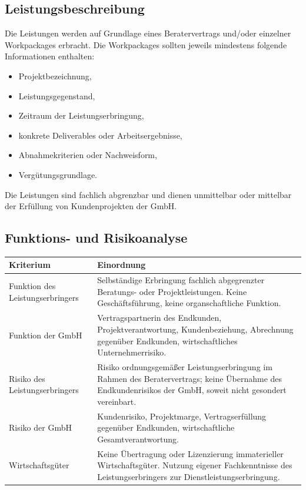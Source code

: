 \documentclass[11pt,a4paper]{article}
\begin{document}
\subsection{Leistungsbeschreibung}

Die Leistungen werden auf Grundlage eines Beratervertrags und/oder einzelner Workpackages erbracht. Die Workpackages sollten jeweils mindestens folgende Informationen enthalten:

\begin{itemize}
    \item Projektbezeichnung,
    \item Leistungsgegenstand,
    \item Zeitraum der Leistungserbringung,
    \item konkrete Deliverables oder Arbeitsergebnisse,
    \item Abnahmekriterien oder Nachweisform,
    \item Vergütungsgrundlage.
\end{itemize}

Die Leistungen sind fachlich abgrenzbar und dienen unmittelbar oder mittelbar der Erfüllung von Kundenprojekten der GmbH.

\subsection{Funktions- und Risikoanalyse}

\begin{longtable}{|p{}|p{}|}
\hline
\textbf{Kriterium} & \textbf{Einordnung} \\
\hline
Funktion des Leistungserbringers & Selbständige Erbringung fachlich abgegrenzter Beratungs- oder Projektleistungen. Keine Geschäftsführung, keine organschaftliche Funktion. \\
\hline
Funktion der GmbH & Vertragspartnerin des Endkunden, Projektverantwortung, Kundenbeziehung, Abrechnung gegenüber Endkunden, wirtschaftliches Unternehmerrisiko. \\
\hline
Risiko des Leistungserbringers & Risiko ordnungsgemäßer Leistungserbringung im Rahmen des Beratervertrags; keine Übernahme des Endkundenrisikos der GmbH, soweit nicht gesondert vereinbart. \\
\hline
Risiko der GmbH & Kundenrisiko, Projektmarge, Vertragserfüllung gegenüber Endkunden, wirtschaftliche Gesamtverantwortung. \\
\hline
Wirtschaftsgüter & Keine Übertragung oder Lizenzierung immaterieller Wirtschaftsgüter. Nutzung eigener Fachkenntnisse des Leistungserbringers zur Dienstleistungserbringung. \\
\hline
\end{longtable}
\end{document}
